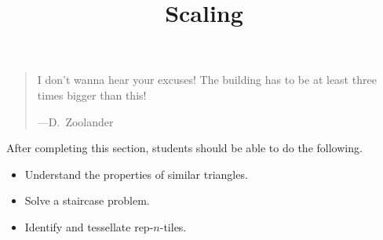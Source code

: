 \documentclass{ximera}
\title{Scaling}
\begin{document}
\begin{abstract}
\end{abstract}
\maketitle

\begin{quote}
  I don't wanna hear your excuses! The building has to be at least
  three times bigger than this!

\hfill---D.\ Zoolander
\end{quote}

After completing this section, students should be able to do the following.

\begin{itemize}
\item Understand the properties of similar triangles.
\item Solve a staircase problem.
\item Identify and tessellate rep-$n$-tiles.
\end{itemize}
\end{document}
